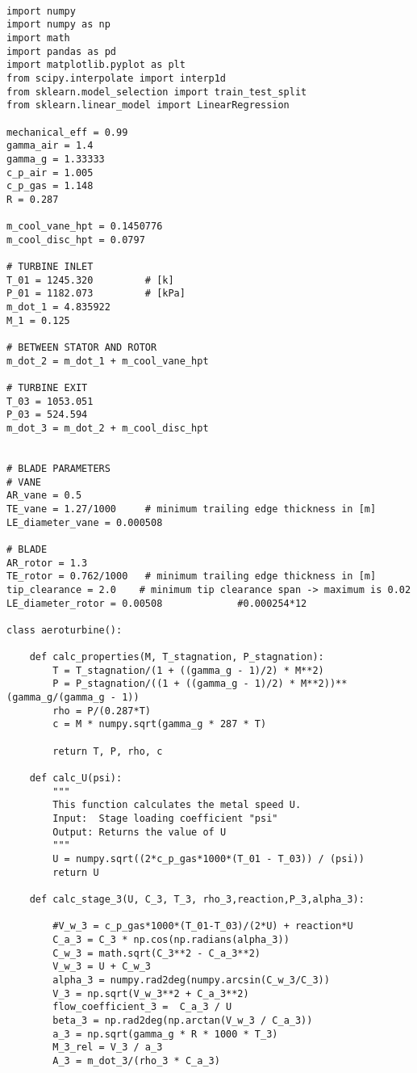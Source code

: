 
\begin{verbatim}

import numpy
import numpy as np
import math
import pandas as pd
import matplotlib.pyplot as plt
from scipy.interpolate import interp1d
from sklearn.model_selection import train_test_split
from sklearn.linear_model import LinearRegression

mechanical_eff = 0.99
gamma_air = 1.4
gamma_g = 1.33333
c_p_air = 1.005
c_p_gas = 1.148
R = 0.287

m_cool_vane_hpt = 0.1450776
m_cool_disc_hpt = 0.0797

# TURBINE INLET
T_01 = 1245.320         # [k]
P_01 = 1182.073         # [kPa]
m_dot_1 = 4.835922
M_1 = 0.125

# BETWEEN STATOR AND ROTOR
m_dot_2 = m_dot_1 + m_cool_vane_hpt

# TURBINE EXIT
T_03 = 1053.051
P_03 = 524.594
m_dot_3 = m_dot_2 + m_cool_disc_hpt


# BLADE PARAMETERS
# VANE
AR_vane = 0.5
TE_vane = 1.27/1000     # minimum trailing edge thickness in [m]
LE_diameter_vane = 0.000508

# BLADE
AR_rotor = 1.3
TE_rotor = 0.762/1000   # minimum trailing edge thickness in [m]
tip_clearance = 2.0    # minimum tip clearance span -> maximum is 0.02
LE_diameter_rotor = 0.00508             #0.000254*12

class aeroturbine():

    def calc_properties(M, T_stagnation, P_stagnation):
        T = T_stagnation/(1 + ((gamma_g - 1)/2) * M**2)
        P = P_stagnation/((1 + ((gamma_g - 1)/2) * M**2))**(gamma_g/(gamma_g - 1))
        rho = P/(0.287*T)
        c = M * numpy.sqrt(gamma_g * 287 * T)

        return T, P, rho, c
    
    def calc_U(psi):
        """
        This function calculates the metal speed U.
        Input:  Stage loading coefficient "psi"
        Output: Returns the value of U
        """
        U = numpy.sqrt((2*c_p_gas*1000*(T_01 - T_03)) / (psi))    
        return U
    
    def calc_stage_3(U, C_3, T_3, rho_3,reaction,P_3,alpha_3):
        
        #V_w_3 = c_p_gas*1000*(T_01-T_03)/(2*U) + reaction*U
        C_a_3 = C_3 * np.cos(np.radians(alpha_3))
        C_w_3 = math.sqrt(C_3**2 - C_a_3**2)
        V_w_3 = U + C_w_3
        alpha_3 = numpy.rad2deg(numpy.arcsin(C_w_3/C_3))
        V_3 = np.sqrt(V_w_3**2 + C_a_3**2)
        flow_coefficient_3 =  C_a_3 / U
        beta_3 = np.rad2deg(np.arctan(V_w_3 / C_a_3))
        a_3 = np.sqrt(gamma_g * R * 1000 * T_3)
        M_3_rel = V_3 / a_3
        A_3 = m_dot_3/(rho_3 * C_a_3)


\end{verbatim}

